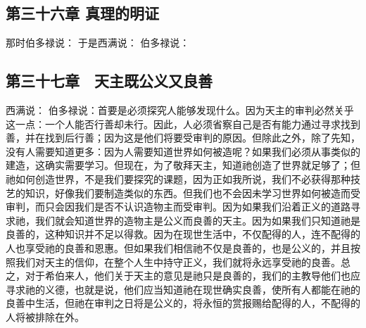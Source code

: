 
\subsection{第三十六章 真理的明证}

那时伯多禄说： 于是西满说： 伯多禄说：\par


\subsection{第三十七章　天主既公义又良善}

西满说： 伯多禄说：首要是必须探究人能够发现什么。因为天主的审判必然关乎这一点：一个人能否行善却未行。因此，人必须省察自己是否有能力通过寻求找到善，并在找到后行善；因为这是他们将要受审判的原因。但除此之外，除了先知，没有人需要知道更多：因为人需要知道世界如何被造呢？如果我们必须从事类似的建造，这确实需要学习。但现在，为了敬拜天主，知道祂创造了世界就足够了；但祂如何创造世界，不是我们要探究的课题，因为正如我所说，我们不必获得那种技艺的知识，好像我们要制造类似的东西。但我们也不会因未学习世界如何被造而受审判，而只会因我们是否不认识造物主而受审判。因为如果我们沿着正义的道路寻求祂，我们就会知道世界的造物主是公义而良善的天主。因为如果我们只知道祂是良善的，这种知识并不足以得救。因为在现世生活中，不仅配得的人，连不配得的人也享受祂的良善和恩惠。但如果我们相信祂不仅是良善的，也是公义的，并且按照我们对天主的信仰，在整个人生中持守正义，我们就将永远享受祂的良善。总之，对于希伯来人，他们关于天主的意见是祂只是良善的，我们的主教导他们也应寻求祂的义德，也就是说，他们应当知道祂在现世确实良善，使所有人都能在祂的良善中生活，但祂在审判之日将是公义的，将永恒的赏报赐给配得的人，不配得的人将被排除在外。\par

